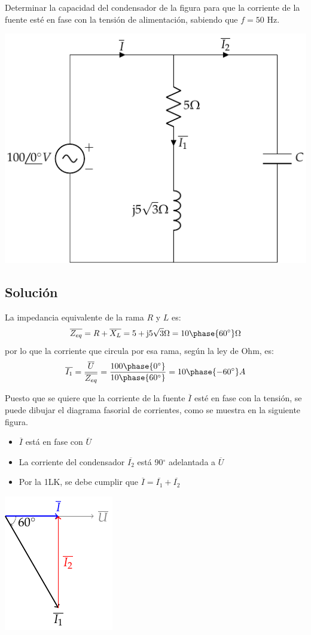 Determinar la capacidad del condensador de la figura para que la
corriente de la fuente esté en fase con la tensión de alimentación,
sabiendo que $f=50$ Hz.

\begin{center}
  \includegraphics[width=0.4\linewidth]{figuras/ejemplo9_BT2.pdf}
\end{center}

\subsection*{Solución}
La impedancia equivalente de la rama $R$ y $L$ es:
\begin{equation*}
  \overline{Z_{eq}}=R+\overline{X_L}=5+\mathrm{j}5\sqrt{3}\Omega=10\phase{60^\circ}\Omega
\end{equation*} por lo
que la corriente que circula por esa rama, según la ley de Ohm, es:
\begin{equation*}
  \overline{I_1}=\dfrac{\overline{U}}{\overline{Z_{eq}}}=\dfrac{100\phase{0^\circ}}{10\phase{60^\circ}}=10\phase{-60^\circ}A
\end{equation*}

Puesto que se quiere que la corriente de la fuente $\overline{I}$ esté
en fase con la tensión, se puede dibujar el diagrama fasorial de
corrientes, como se muestra en la siguiente figura.
\begin{itemize}
\item $\overline{I}$ está en fase con $\overline{U}$
\item La corriente del condensador $\overline{I_2}$ está 90$^\circ$
  adelantada a $\overline{U}$
\item Por la 1LK, se debe cumplir que
  $\overline{I}=\overline{I_1}+\overline{I_2}$
\end{itemize}

\begin{center}
  \includegraphics{figuras/fasores_corriente_BT2_09.pdf}
\end{center}
	    
